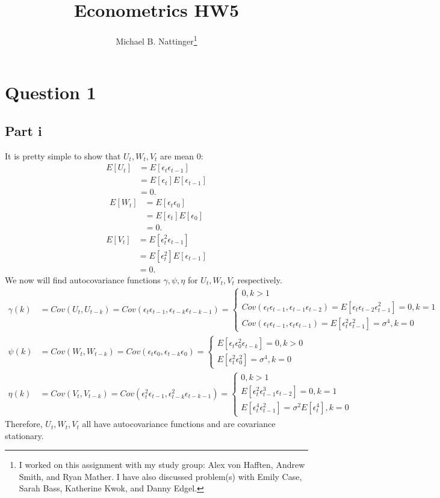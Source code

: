 \documentclass[11pt]{article} %
\title{Econometrics HW5}
\author{Michael B. Nattinger\footnote{I worked on this assignment with my study group: Alex von Hafften, Andrew Smith, and Ryan Mather. I have also discussed problem(s) with Emily Case, Sarah Bass, Katherine Kwok, and Danny Edgel.}}
\begin{document}
\maketitle

\section{Question 1}
\subsection{Part i}
It is pretty simple to show that $U_t,W_t,V_t$ are mean $0$:
\begin{align*}
E[U_t] &= E[\epsilon_t \epsilon_{t-1}]\\
&= E[\epsilon_{t}]E[\epsilon_{t-1}]\\
&= 0.
\end{align*}
\begin{align*}
E[W_t] &= E[\epsilon_t \epsilon_{0}]\\
&= E[\epsilon_{t}]E[\epsilon_{0}]\\
&= 0.
\end{align*}
\begin{align*}
E[V_t] &= E[\epsilon_t^{2} \epsilon_{t-1}]\\
&= E[\epsilon_{t}^2]E[\epsilon_{t-1}]\\
&= 0.
\end{align*}
We now will find autocovariance functions $\gamma,\psi,\eta$ for $U_t,W_t,V_t$ respectively.
\begin{align*}
\gamma(k) &= Cov(U_t,U_{t-k}) = Cov(\epsilon_t \epsilon_{t-1},\epsilon_{t-k} \epsilon_{t-k-1})  = \begin{cases} 0, k>1\\
Cov(\epsilon_{t} \epsilon_{t-1}, \epsilon_{t-1} \epsilon_{t-2}) = E[\epsilon_t \epsilon_{t-2} \epsilon_{t-1}^2] = 0, k=1\\
Cov(\epsilon_{t} \epsilon_{t-1}, \epsilon_{t} \epsilon_{t-1}) = E[\epsilon_{t}^2 \epsilon_{t-1}^2] = \sigma^4 , k = 0
\end{cases} \\
\psi(k) &=Cov(W_t,W_{t-k}) = Cov(\epsilon_t \epsilon_{0},\epsilon_{t-k} \epsilon_{0}) = \begin{cases} E[\epsilon_t \epsilon_{0}^2\epsilon_{t-k}] = 0, k>0\\
E[\epsilon_{t}^2 \epsilon_{0}^2] = \sigma^4 , k = 0
\end{cases} \\
\eta(k) &= Cov(V_t,V_{t-k}) = Cov(\epsilon_t^2 \epsilon_{t-1},\epsilon_{t-k}^2 \epsilon_{t-k-1})  = \begin{cases} 0, k>1\\
E[\epsilon_t^2 \epsilon_{t-1}^3 \epsilon_{t-2}] = 0, k=1\\
 E[\epsilon_t^4 \epsilon_{t-1}^2 ]  = \sigma^2E[\epsilon_t^4] , k = 0
\end{cases} 
\end{align*}
Therefore, $U_t,W_t,V_t$ all have autocovariance functions and are covariance stationary.
\end{document}
